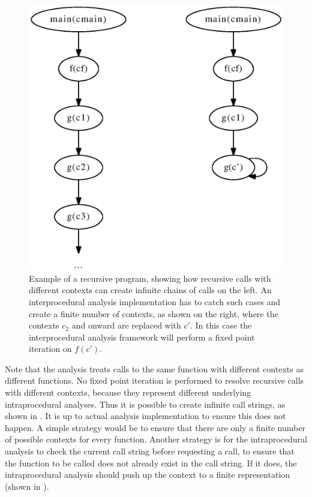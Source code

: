 \begin{figure}[htbp]
\begin{center}
\includegraphics[scale=.6]{Figures/chain.eps}
\caption[Example program showing an infinite chain of calls.]{
Example of a recursive program, showing how recursive calls
with different contexts can create infinite chains of calls on the left.
An interprocedural analysis implementation has to catch
such cases and create a finite number of contexts, as shown on 
the right, where the contexts $c_2$ and onward are replaced with $c'$.
In this case the interprocedural analysis framework will perform a
fixed point iteration on $f(c')$.}
\label{Fig:chain}
\end{center}
\end{figure}

Note that the analysis treats calls to the same function with 
different contexts as different functions. No fixed point iteration
is performed to resolve recursive calls with different contexts,
because they represent different underlying intraprocedural analyses.
Thus it is possible to create infinite call strings, as shown in 
.
It is up to  actual analysis implementation to ensure this does not
happen. A simple strategy would be to ensure that there are only
a finite number of possible contexts for every function. Another strategy
is for the intraprocedural analysis to check the current call string
before requesting a call, to ensure that the function to be called
does not already exist in the call string. If it does, the intraprocedural
analysis should push up the context to a finite representation (shown 
in ).

